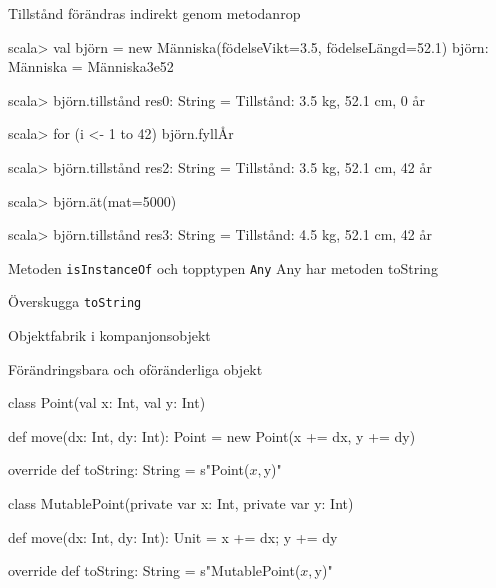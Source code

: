\begin{Slide}{Tillstånd förändras indirekt genom metodanrop}
\begin{REPL}
scala> val björn = new Människa(födelseVikt=3.5, födelseLängd=52.1)
björn: Människa = Människa3e52

scala> björn.tillstånd
res0: String = Tillstånd: 3.5 kg, 52.1 cm, 0 år

scala> for (i <- 1 to 42) björn.fyllÅr

scala> björn.tillstånd
res2: String = Tillstånd: 3.5 kg, 52.1 cm, 42 år

scala> björn.ät(mat=5000)

scala> björn.tillstånd
res3: String = Tillstånd: 4.5 kg, 52.1 cm, 42 år
\end{REPL}
\end{Slide}

\begin{Slide}{Metoden \texttt{isInstanceOf} och topptypen \texttt{Any}}
Any har metoden toString
\end{Slide}

\begin{Slide}{Överskugga \texttt{toString}}
\end{Slide}

\begin{Slide}{Objektfabrik i kompanjonsobjekt}
\end{Slide}


\begin{Slide}{Förändringsbara och oföränderliga objekt}
\begin{Code}
class Point(val x: Int, val y: Int) {
  def move(dx: Int, dy: Int): Point = new Point(x += dx, y += dy)
  
  override def toString: String = s"Point($x, $y)"
}

class MutablePoint(private var x: Int, private var y: Int) {
  def move(dx: Int, dy: Int): Unit = {x += dx; y += dy}
  
  override def toString: String = s"MutablePoint($x, $y)"
}

\end{Code}
\end{Slide}



